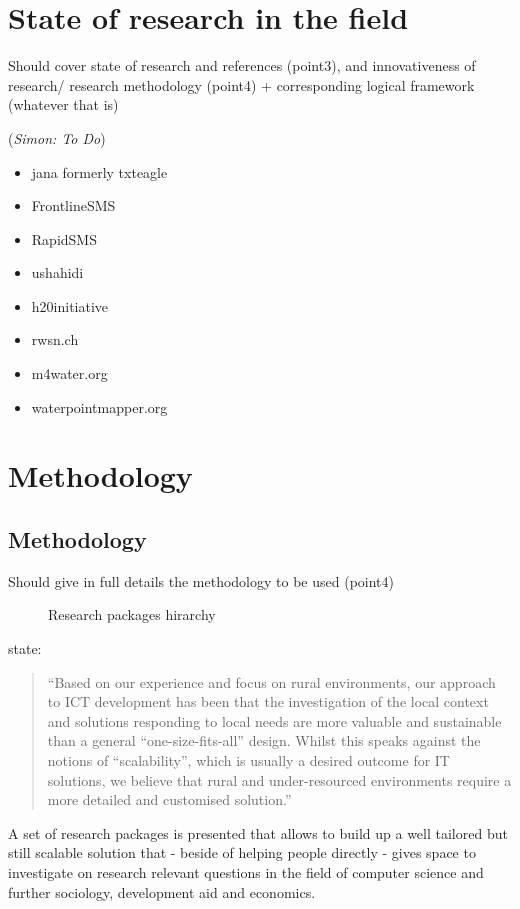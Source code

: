 \documentclass[11pt]{article}
\newcommand{\simon}[1]{\vspace{1em}(\emph{Simon: #1})\vspace{1em}}
\begin{document}
\section{State of research in the field}\label{state_of_research}
Should cover state of research and references (point3), and innovativeness of research/ research methodology (point4) + corresponding logical framework (whatever that is)

\simon{To Do}

\begin{itemize}
 \item jana formerly txteagle
 \item FrontlineSMS
 \item RapidSMS
 \item ushahidi
 \item h20initiative
 \item rwsn.ch
 \item m4water.org
 \item waterpointmapper.org
\end{itemize}


\section{Methodology}\label{methodology}
\subsection{Methodology}\label{metho}
Should give in full details the methodology to be used (point4)
\begin{figure}
\begin{center}
 
\end{center}
\caption{Research packages hirarchy}
\label{tikz:researchpackages}
\end{figure} 
\citet{champanis2012reporting} state: \begin{quote}
``Based on our experience and focus on rural environments, our
approach to ICT development has been that the investigation of
the local context and solutions responding to local needs are more
valuable and sustainable than a general “one-size-fits-all” design.
Whilst this speaks against the notions of “scalability”, which is
usually a desired outcome for IT solutions, we believe that rural
and under-resourced environments require a more detailed and
customised solution.''\end{quote} 

A set of research packages is presented that allows to build up a well tailored but still scalable solution that - beside of helping people directly -  gives space to investigate on research relevant questions in the field of computer science and further sociology, development aid and economics. 
\end{document}
